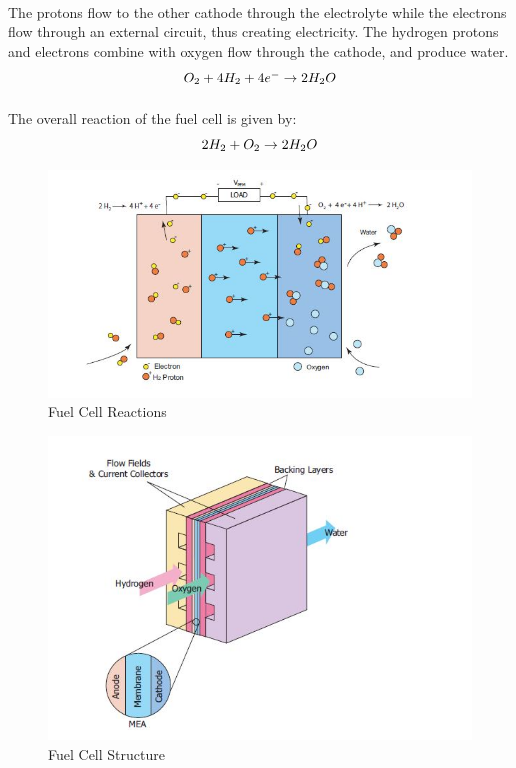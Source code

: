 \paragraph{}The protons ﬂow to the other cathode through the electrolyte while the electrons ﬂow through an external circuit, thus creating electricity. The hydrogen protons and electrons combine with oxygen ﬂow through the cathode, and produce water.
\begin{equation}
$$O_{2}+ 4H_{2} + 4e^{-} \rightarrow 2H_{2}O $$
\end{equation}
\paragraph{}The overall reaction of the fuel cell is given by:
\begin{equation}
$$2H_{2}+ O_{2} \rightarrow 2H_{2}O $$
\end{equation}
\begin{figure}[!h]
\includegraphics{Figures/Figure2}
\caption{Fuel Cell Reactions
\cite{pukrushpan_modeling_2003}}
\end{figure}

\begin{figure}
\includegraphics{Figures/Figure3}
\caption{Fuel Cell Structure
\cite{pukrushpan_modeling_2003}}
\end{figure}


